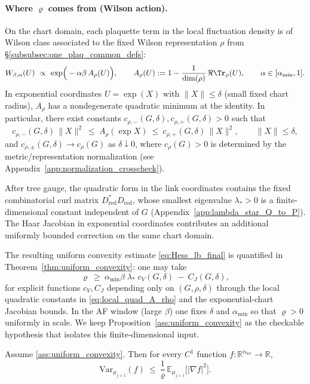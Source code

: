 \paragraph{Where $\varrho$ comes from (Wilson action).}
On the chart domain, each plaquette term in the local fluctuation density is of Wilson class associated to the fixed Wilson representation $\rho$ from \S\ref{subsubsec:one_plaq_common_defs}:
\[
W_{\beta,\alpha}(U)\ \propto\ \exp\!\Big(-\alpha\beta\,A_{\rho}(U)\Big),
\qquad
A_{\rho}(U):=1-\frac{1}{\dim(\rho)}\,\Re\Tr_{\rho}(U),
\qquad \alpha\in[\alpha_{\min},1].
\]
In exponential coordinates $U=\exp(X)$ with $\|X\|\le \delta$ (small fixed chart radius),
$A_{\rho}$ has a nondegenerate quadratic minimum at the identity. In particular, there exist constants
$c_{\rho,-}(G,\delta),c_{\rho,+}(G,\delta)>0$ such that
\begin{equation}\label{eq:local_quad_A_rho}
c_{\rho,-}(G,\delta)\,\|X\|^2\ \le\ A_{\rho}(\exp X)\ \le\ c_{\rho,+}(G,\delta)\,\|X\|^2,
\qquad \|X\|\le \delta,
\end{equation}
and $c_{\rho,\pm}(G,\delta)\to c_{\rho}(G)$ as $\delta\downarrow 0$, where $c_{\rho}(G)>0$ is determined by the metric/representation normalization
(see Appendix~\ref{app:normalization_crosscheck}).

After tree gauge, the quadratic form in the link coordinates contains the fixed combinatorial curl matrix $D_{\mathrm{red}}^\ast D_{\mathrm{red}}$,
whose smallest eigenvalue $\lambda_\ast>0$ is a finite-dimensional constant independent of $G$ (Appendix~\ref{app:lambda_star_Q_to_P}).
The Haar Jacobian in exponential coordinates contributes an additional uniformly bounded correction on the same chart domain.

The resulting uniform convexity estimate \eqref{eq:Hess_lb_final} is quantified in Theorem~\ref{thm:uniform_convexity}:
one may take
\[
\varrho\ \ge\ \alpha_{\min}\beta\;\lambda_\ast\;c_V(G,\delta)\ -\ C_J(G,\delta),
\]
for explicit functions $c_V,C_J$ depending only on $(G,\rho,\delta)$ through the local quadratic constants in \eqref{eq:local_quad_A_rho}
and the exponential-chart Jacobian bounds.
In the AF window (large $\beta$) one fixes $\delta$ and $\alpha_{\min}$ so that $\varrho>0$ uniformly in scale.
We keep Proposition~\ref{ass:uniform_convexity} as the checkable hypothesis that isolates this finite-dimensional input.

\begin{lemma}\label{lem:BL}
Assume \ref{ass:uniform_convexity}. Then for every $C^1$ function $f:\mathbb R^{n_{\mathrm{loc}}}\to\mathbb R$,
\[
\mathrm{Var}_{\mu_{j+1}}(f)\ \le\ \frac{1}{\varrho}\,\mathbb E_{\mu_{j+1}}\big[|\nabla f|^2\big].
\]
\end{lemma}

